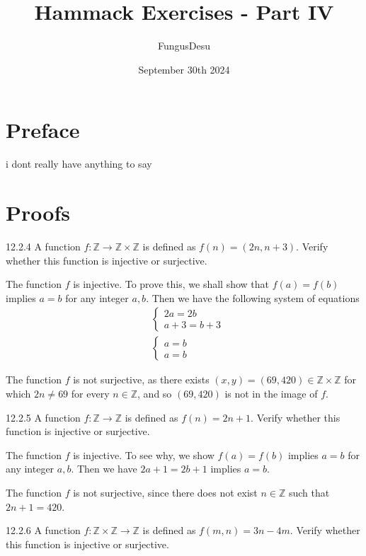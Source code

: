 \documentclass{exam}
\title{Hammack Exercises - Part IV}
\author{FungusDesu}
\date{September 30th 2024}
\begin{document}
\maketitle

\section{Preface}
i dont really have anything to say

\section{Proofs}

\begin{problem}{12.2.4}
	A function $f:\mathbb Z\rightarrow\mathbb Z\times\mathbb Z$ is defined as $f(n)=(2n, n + 3)$. Verify whether this function is injective or surjective.
\end{problem}

The function $f$ is injective. To prove this, we shall show that $f(a) = f(b)$ implies $a = b$ for any integer $a,b$. Then we have the following system of equations 
\begin{align*}
	&\begin{cases}
		2a = 2b\\
		a + 3 = b + 3
	\end{cases}\\
	&\begin{cases}
		a = b\\
		a = b
	\end{cases}
\end{align*}

The function $f$ is not surjective, as there exists $(x, y) = (69, 420)\in\mathbb Z\times\mathbb Z$ for which $2n \neq 69$ for every $n\in\mathbb Z$, and so $(69, 420)$ is not in the image of $f$.

\begin{problem}{12.2.5}
	A function $f:\mathbb Z\rightarrow\mathbb Z$ is defined as $f(n)=2n+1$. Verify whether this function is injective or surjective.
\end{problem}

The function $f$ is injective. To see why, we show $f(a) = f(b)$ implies $a = b$ for any integer $a, b$. Then we have $2a + 1 = 2b + 1$ implies $a = b$.

The function $f$ is not surjective, since there does not exist $n\in\mathbb Z$ such that $2n + 1 = 420$.

\begin{problem}{12.2.6}
	A function $f:\mathbb Z\times\mathbb Z\rightarrow\mathbb Z$ is defined as $f(m, n)=3n-4m$. Verify whether this function is injective or surjective.
\end{problem}
\end{document}
